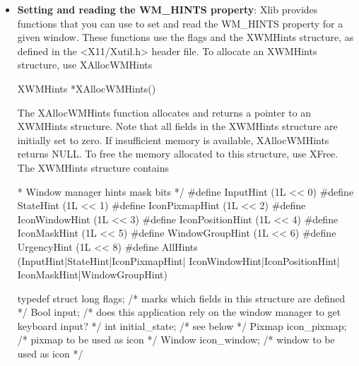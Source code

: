 \documentclass{report}
\begin{document}
\begin{itemize}
\begin{itemize}
            \bigbreak \noindent 
            XGetIconName can generate a BadWindow error
        \item \textbf{Setting and reading the WM\_HINTS property}: Xlib provides functions that you can use to set and read the WM_HINTS property for a given window. These functions use the flags and the XWMHints structure, as defined in the <X11/Xutil.h> header file.
            \bigbreak \noindent 
            To allocate an XWMHints structure, use XAllocWMHints
            \bigbreak \noindent 
            \begin{cppcode}
            XWMHints *XAllocWMHints()
            \end{cppcode}
            \bigbreak \noindent 
            The XAllocWMHints function allocates and returns a pointer to an XWMHints structure. Note that all fields in the XWMHints structure are initially set to zero. If insufficient memory is available, XAllocWMHints returns NULL. To free the memory allocated to this structure, use XFree.
            \bigbreak \noindent 
            The XWMHints structure contains
            \bigbreak \noindent 
            \begin{cppcode}
                * Window manager hints mask bits */
                #define InputHint               (1L << 0)
                #define StateHint               (1L << 1)
                #define IconPixmapHint          (1L << 2)
                #define IconWindowHint          (1L << 3)
                #define IconPositionHint        (1L << 4)
                #define IconMaskHint            (1L << 5)
                #define WindowGroupHint         (1L << 6)
                #define UrgencyHint             (1L << 8)
                #define AllHints                (InputHint|StateHint|IconPixmapHint|
                                                IconWindowHint|IconPositionHint|
                                                IconMaskHint|WindowGroupHint)
            \end{cppcode}
            \bigbreak \noindent 
            \begin{cppcode}
                typedef struct {
                    long flags;                 /* marks which fields in this structure are defined */
                    Bool input;                 /* does this application rely on the window manager to get keyboard input? */
                    int initial_state;          /* see below */
                    Pixmap icon_pixmap;         /* pixmap to be used as icon */
                    Window icon_window;         /* window to be used as icon */
}
\end{cppcode}
\end{itemize}
\end{itemize}
\end{document}
